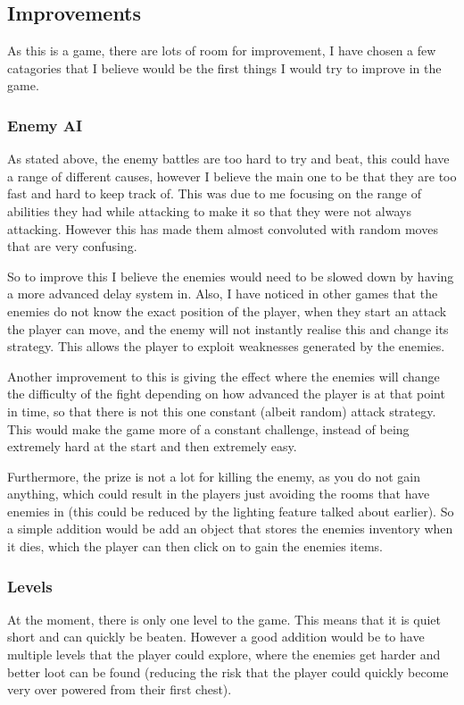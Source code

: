 \documentclass[../Main.tex]{subfiles}
\begin{document}
    \subsection{Improvements}
        As this is a game, there are lots of room for improvement, I have chosen a few catagories that I believe would be the first things I would try to improve in the game.
        \subsubsection{Enemy AI}
            As stated above, the enemy battles are too hard to try and beat, this could have a range of different causes, however I believe the main one to be that they are too fast and hard to keep track of. This was due to me focusing on the range of abilities they had while attacking to make it so that they were not always attacking. However this has made them almost convoluted with random moves that are very confusing.

            So to improve this I believe the enemies would need to be slowed down by having a more advanced delay system in. Also, I have noticed in other games that the enemies do not know the exact position of the player, when they start an attack the player can move, and the enemy will not instantly realise this and change its strategy. This allows the player to exploit weaknesses generated by the enemies.

            Another improvement to this is giving the effect where the enemies will change the difficulty of the fight depending on how advanced the player is at that point in time, so that there is not this one constant (albeit random) attack strategy. This would make the game more of a constant challenge, instead of being extremely hard at the start and then extremely easy.

            Furthermore, the prize is not a lot for killing the enemy, as you do not gain anything, which could result in the players just avoiding the rooms that have enemies in (this could be reduced by the lighting feature talked about earlier). So a simple addition would be add an object that stores the enemies inventory when it dies, which the player can then click on to gain the enemies items.

        \subsubsection{Levels}
            At the moment, there is only one level to the game. This means that it is quiet short and can quickly be beaten. However a good addition would be to have multiple levels that the player could explore, where the enemies get harder and better loot can be found (reducing the risk that the player could quickly become very over powered from their first chest).
\end{document}
